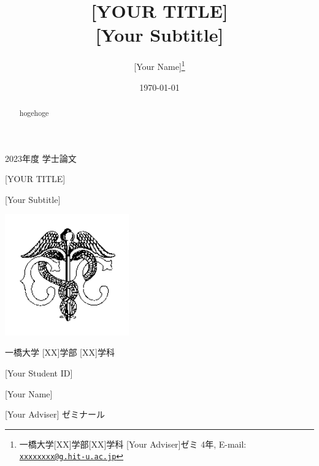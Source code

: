 \documentclass[a4paper, 12pt]{ltjsarticle}
\title{[YOUR TITLE]\\
  \large{[Your Subtitle]}}
\author{[Your Name]\thanks{一橋大学[XX]学部[XX]学科 [Your Adviser]ゼミ 4年, E-mail: \href{mailto:xxxxxxxx@g.hit-u.ac.jp}{\nolinkurl{xxxxxxxx@g.hit-u.ac.jp}}}}
\date{\today}
\begin{document}
\begin{titlepage}
  \begin{center}

      {\Large 2023年度 学士論文}

      \vspace*{50truept}

      {\LARGE [YOUR TITLE]}

      \vspace{10truept}

      {\large [Your Subtitle]} 

      \vspace{30truept}

      \includegraphics[width=0.4\textwidth]{input/mercury.png}

      \vspace{30truept}

      {\Large 一橋大学 [XX]学部 [XX]学科}

      \vspace{10truept}

      {\Large [Your Student ID]}

      \vspace{10truept}

      {\Large [Your Name]}
      
      \vspace{30truept}

      {\Large [Your Adviser] ゼミナール}

  \end{center}
\end{titlepage}

\tableofcontents

\newpage
\maketitle
\begin{abstract}
  hogehoge
\end{abstract}
\end{document}
